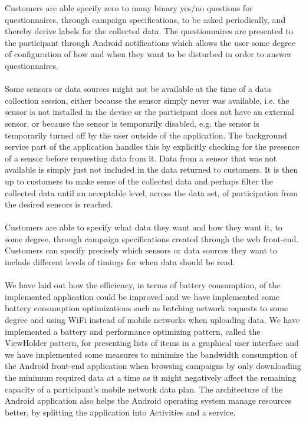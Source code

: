Customers are able specify zero to many binary yes/no questions for questionnaires, through campaign specifications, to be asked periodically, and thereby derive labels for the collected data. The questionnaires are presented to the participant through Android notifications which allows the user some degree of configuration of how and when they want to be disturbed in order to answer questionnaires. 
\\\\
Some sensors or data sources might not be available at the time of a data collection session, either because the sensor simply never was available, i.e. the sensor is not installed in the device or the participant does not have an external sensor, or because the sensor is temporarily disabled, e.g. the sensor is temporarily turned off by the user outside of the application. The background service part of the application handles this by explicitly checking for the presence of a sensor before requesting data from it. Data from a sensor that was not available is simply just not included in the data returned to customers. It is then up to customers to make sense of the collected data and perhaps filter the collected data until an acceptable level, across the data set, of participation from the desired sensors is reached.
\\\\
Customers are able to specify what data they want and how they want it, to some degree, through campaign specifications created through the web front-end. Customers can specify precisely which sensors or data sources they want to include different levels of timings for when data should be read. 
\\\\
We have laid out how the efficiency, in terms of battery consumption, of the implemented application could be improved and we have implemented some battery consumption optimizations such as batching network requests to some degree and using WiFi instead of mobile networks when uploading data. We have implemented a battery and performance optimizing pattern, called the ViewHolder pattern, for presenting lists of items in a graphical user interface and we have implemented some measures to minimize the bandwidth consumption of the Android front-end application when browsing campaigns by only downloading the minimum required data at a time as it might negatively affect the remaining capacity of a participant's mobile network data plan. The architecture of the Android application also helps the Android operating system manage resources better, by splitting the application into Activities and a service. \\
